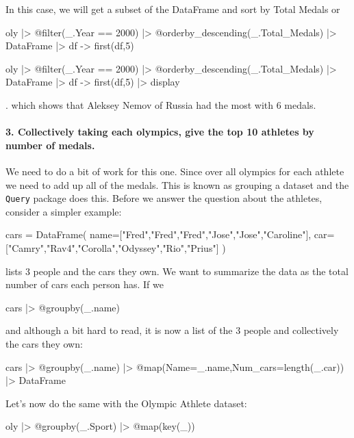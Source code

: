 In this case, we will get a subset of the DataFrame and sort by Total
Medals or

\begin{jlblock}[data]
oly |>
  @filter(_.Year == 2000) |>
  @orderby_descending(_.Total_Medals) |>
  DataFrame |>
  df -> first(df,5)
\end{jlblock}
\begin{jlcode}[data]
oly |>
  @filter(_.Year == 2000) |>
  @orderby_descending(_.Total_Medals) |>
  DataFrame |>
  df -> first(df,5) |>
  display
\end{jlcode}
\printpythontex[verbatim][breakanywhere=true].
%
which shows that Aleksey Nemov of Russia had the most with 6 medals.


\paragraph{3. Collectively taking each olympics, give the top 10 athletes by number of medals.}

We need to do a bit of work for this one. Since over all olympics for
each athlete we need to add up all of the medals. This is known as
grouping a dataset and the \texttt{Query} package does this. Before we
answer the question about the athletes, consider a simpler example:

\begin{jlblock}[data]
cars = DataFrame(
  name=["Fred","Fred","Fred","Jose","Jose","Caroline"],
  car=["Camry","Rav4","Corolla","Odyssey","Rio","Prius"]
)
\end{jlblock}

lists 3 people and the cars they own. We want to summarize the data as
the total number of cars each person has. If we

\begin{jlblock}[data]
cars |> @groupby(_.name)
\end{jlblock}

and although a bit hard to read, it is now a list of the 3 people and
collectively the cars they own:

\begin{jlblock}[data]
cars |>
  @groupby(_.name) |>
  @map({Name=_.name,Num_cars=length(_.car)}) |>
  DataFrame
\end{jlblock}

Let's now do the same with the Olympic Athlete dataset:

\begin{jlblock}[data]
oly |>
  @groupby(_.Sport) |>
  @map(key(_))
\end{jlblock}

